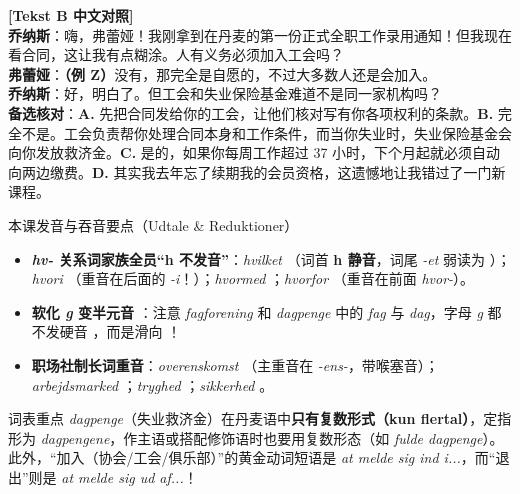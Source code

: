 \begin{transbox}
\small
\textbf{\color{NCDTeal}[Tekst B 中文对照]}\\
\textbf{乔纳斯}：嗨，弗蕾娅！我刚拿到在丹麦的第一份正式全职工作录用通知！但我现在看合同，这让我有点糊涂。人有义务必须加入工会吗？\\
\textbf{弗蕾娅}：\textbf{（例 Z）}没有，那完全是自愿的，不过大多数人还是会加入。\\
\textbf{乔纳斯}：好，明白了。但工会和失业保险基金难道不是同一家机构吗？\\
\textbf{备选核对}：\textbf{A.} 先把合同发给你的工会，让他们核对写有你各项权利的条款。\quad \textbf{B.} 完全不是。工会负责帮你处理合同本身和工作条件，而当你失业时，失业保险基金会向你发放救济金。\quad \textbf{C.} 是的，如果你每周工作超过 37 小时，下个月起就必须自动向两边缴费。\quad \textbf{D.} 其实我去年忘了续期我的会员资格，这遗憾地让我错过了一门新课程。
\end{transbox}

\begin{tipbox}{本课发音与吞音要点（Udtale \& Reduktioner）}
\begin{itemize}
  \item \textbf{\textit{hv-} 关系词家族全员“h 不发音”}：\textit{hvilket} （词首 \textbf{h 静音}，词尾 \textit{-et} 弱读为 ）；\textit{hvori} （重音在后面的 \textit{-i}！）；\textit{hvormed} ；\textit{hvorfor} （重音在前面 \textit{hvor-}）。
  \item \textbf{软化 \textit{g} 变半元音 }：注意 \textit{fagforening}  和 \textit{dagpenge}  中的 \textit{fag} 与 \textit{dag}，字母 \textit{g} 都不发硬音 ，而是滑向 ！
  \item \textbf{职场社制长词重音}：\textit{overenskomst} （主重音在 \textit{-ens-}，带喉塞音）；\textit{arbejdsmarked} ；\textit{tryghed} ；\textit{sikkerhed} 。
\end{itemize}
\end{tipbox}


\begin{tipbox}{词表重点}
\textit{dagpenge}（失业救济金）在丹麦语中\textbf{只有复数形式（kun flertal）}，定指形为 \textit{dagpengene}，作主语或搭配修饰语时也要用复数形态（如 \textit{fulde dagpenge}）。此外，“加入（协会/工会/俱乐部）”的黄金动词短语是 \textit{at melde sig ind i...}，而“退出”则是 \textit{at melde sig ud af...}！
\end{tipbox}

